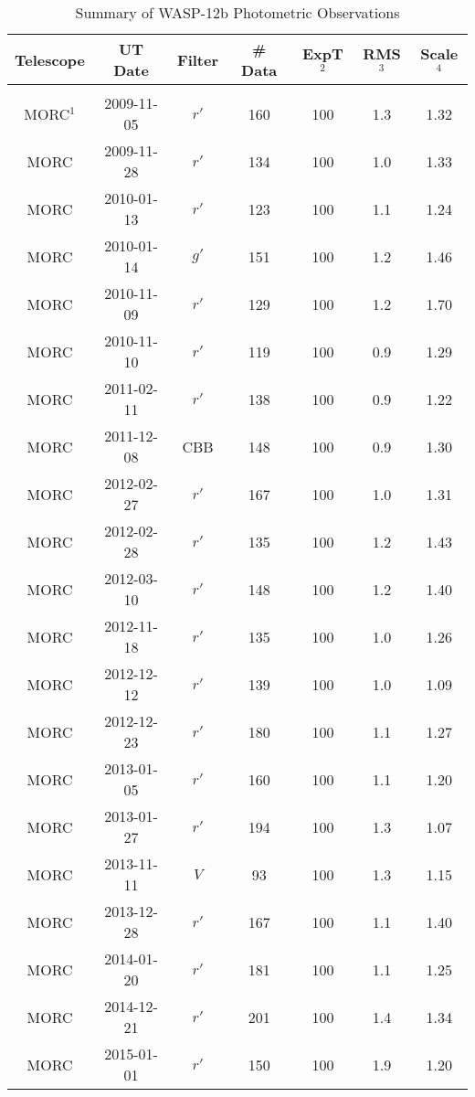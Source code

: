 \begin{center}
\begin{table*}[!ht]
\centering
\begin{threeparttable}
\caption[WASP-12b Summary of Photometric Observations]{Summary of WASP-12b 
	Photometric Observations \label{tab:wasp12alltransits}}
\begin{tabular}{ccccccc}
\hline\hline
\multicolumn{1}{l}{Telescope} & 
\multicolumn{1}{c}{UT Date}   & 
\multicolumn{1}{c}{Filter}    & 
\multicolumn{1}{c}{\# Data}   & 
\multicolumn{1}{c}{ExpT$^2$}  & 
\multicolumn{1}{c}{RMS$^3$}   & 
\multicolumn{1}{c}{Scale$^4$} \\
\hline
&&&&\\
MORC$^1$ & 2009-11-05 & $r'$ & 160 & 100 & 1.3 & 1.32\\
MORC & 2009-11-28 & $r'$ & 134 & 100 & 1.0 & 1.33\\
MORC & 2010-01-13 & $r'$ & 123 & 100 & 1.1 & 1.24\\
MORC & 2010-01-14 & $g'$ & 151 & 100 & 1.2 & 1.46\\
MORC & 2010-11-09 & $r'$ & 129 & 100 & 1.2 & 1.70\\
MORC & 2010-11-10 & $r'$ & 119 & 100 & 0.9 & 1.29\\
MORC & 2011-02-11 & $r'$ & 138 & 100 & 0.9 & 1.22\\
MORC & 2011-12-08 & CBB & 148 & 100 & 0.9 & 1.30\\
MORC & 2012-02-27 & $r'$ & 167 & 100 & 1.0 & 1.31\\
MORC & 2012-02-28 & $r'$ & 135 & 100 & 1.2 & 1.43\\
MORC & 2012-03-10 & $r'$ & 148 & 100 & 1.2 & 1.40\\
MORC & 2012-11-18 & $r'$ & 135 & 100 & 1.0 & 1.26\\
MORC & 2012-12-12 & $r'$ & 139 & 100 & 1.0 & 1.09\\
MORC & 2012-12-23 & $r'$ & 180 & 100 & 1.1 & 1.27\\
MORC & 2013-01-05 & $r'$ & 160 & 100 & 1.1 & 1.20\\
MORC & 2013-01-27 & $r'$ & 194 & 100 & 1.3 & 1.07\\
MORC & 2013-11-11 & $V$ &  93 & 100 & 1.3 & 1.15\\
MORC & 2013-12-28 & $r'$ & 167 & 100 & 1.1 & 1.40\\
MORC & 2014-01-20 & $r'$ & 181 & 100 & 1.1 & 1.25\\
MORC & 2014-12-21 & $r'$ & 201 & 100 & 1.4 & 1.34\\
MORC & 2015-01-01 & $r'$ & 150 & 100 & 1.9 & 1.20\\

\end{tabular}
\end{threeparttable}
\end{table*}
\end{center}
